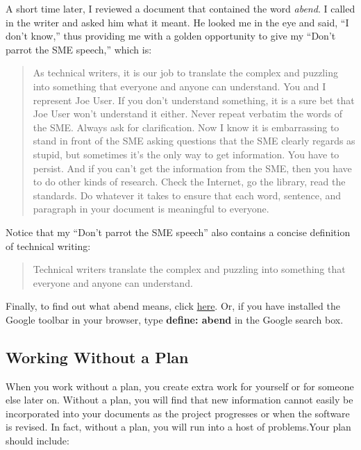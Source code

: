 \documentclass[12pt]{article}
\begin{document}
A short time later, I reviewed a document that contained the word \emph{abend}. I called in the writer and asked him what it meant. He looked me in the eye and said, ``I don't know,'' thus providing me with a golden opportunity to give my ``Don't parrot the SME speech,'' which is:

\begin{quote}
As technical writers, it is our job to translate the complex and puzzling into something that everyone and anyone can understand. You and I represent Joe User. If you don't understand something, it is a sure bet that Joe User won't understand it either. Never
repeat verbatim the words of the SME. Always ask for clarification. Now I know it is embarrassing to stand in front of the SME asking questions that the SME clearly regards as stupid, but sometimes it's the only way to get information. You have to persist. And if you can't get the information from the SME, then you have to do other kinds of research. Check the Internet, go the library, read the standards. Do whatever it takes to ensure that each word, sentence, and paragraph in your document is meaningful to everyone.
\end{quote}

Notice that my ``Don't parrot the SME speech'' also contains a concise definition of technical writing:

\begin{quote}
Technical writers translate the complex and puzzling into something that everyone and anyone can understand.
\end{quote}

Finally, to find out what abend means, click \href{http://www.geek.com/glossary/glossary_search.cgi?a}{here}. Or, if you have installed the Google toolbar in your browser, type \textbf{define: abend} in the Google search box.

\subsection{Working Without a Plan}
When you work without a plan, you create extra work for yourself or for someone else later on. Without a plan, you will find that new information cannot easily be incorporated into your documents as the project progresses or when the software is revised. In fact, without a plan, you will run into a host of problems.Your plan should include:
\end{document}
